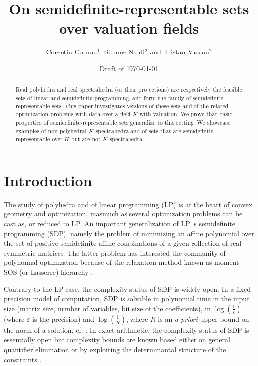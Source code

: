 \documentclass[a4paper,12pt]{article}
\title{\bf On semidefinite-representable sets over valuation fields}
\begin{document}
\author{Corentin Cornou$^{1}$, Simone Naldi$^{2}$ and Tristan Vaccon$^{2}$}


\date{Draft of \today}

\maketitle

\begin{abstract}
  \noindent
  Real polyhedra and real spectrahedra (or their projections) are respectively the feasible sets
  of linear and semidefinite programming, and form the family of
  semidefinite-representable sets. This paper investigates versions of these sets and of
  the related optimization problems with data over a field $K$ with valuation.
  We prove that basic properties of semidefinite-representable sets generalize to this setting.
  We showcase examples of non-polyhedral $K$-spectrahedra and of sets that are semidefinite
  representable over $K$ but are not $K$-spectrahedra.
\end{abstract}


\section{Introduction}

The study of polyhedra and of linear programming (LP) is at the heart of convex geometry and optimization,
inasmuch as several optimization problems can be cast as, or reduced to LP. An important generalization of LP
is semidefinite programming (SDP), namely the problem of minimizing an affine polynomial over the set of
positive semidefinite affine combinations of a given collection of real symmetric matrices. The latter problem 
has interested the community of polynomial optimization because of the relaxation method known as moment-SOS
(or Lasserre) hierarchy \cite{henrion2020moment}.

Contrary to the LP case, the complexity status of SDP is widely open.
In a fixed-precision model of computation, SDP is solvable in polynomial time in the input size (matrix size,
number of variables, bit size of the coefficients), in $\log(\frac{1}{\varepsilon})$ (where $\varepsilon$ is the
precision) and $\log(\frac{1}{R})$, where $R$ is an {\it a priori} upper bound on the norm of a solution,
cf. \cite[Sec.1.9]{deKlerk}. In exact arithmetic, the complexity status of SDP is essentially open but complexity
bounds are known based either on general quantifier elimination \cite{ramana1997exact,porkolab1997complexity}
or by exploiting the determinantal structure of the constraints \cite{henrion2016exact}.
\end{document}
